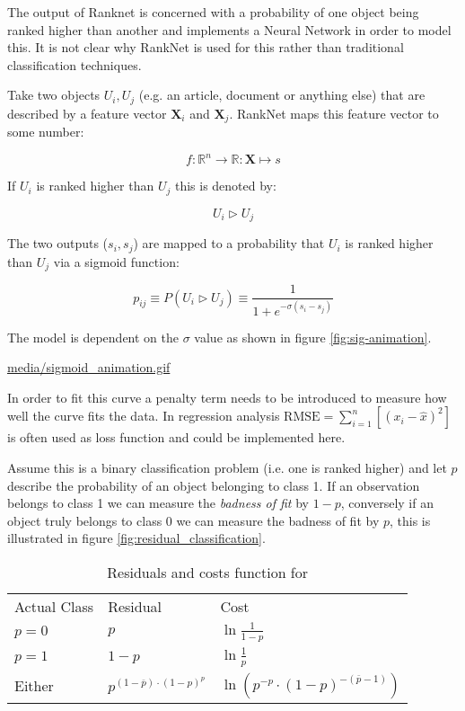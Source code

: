 \documentclass[a4paper,11pt,twoside]{article}
\begin{document}
The output of Ranknet is concerned with a probability of one object being ranked
higher than another and implements a Neural Network in order to model this. It
is not clear why RankNet is used for this rather than traditional classification
techniques.


Take two objects \(U_{i}, U_{j}\) (e.g. an article, document or anything else)
that are described by a feature vector \(\mathbf{X}_{i}\) and
\(\mathbf{X}_{j}\). RankNet maps this feature vector to some number:

\[
f: \mathbb{R}^{n} \rightarrow \mathbb{R}: \mathbf{X} \mapsto s
\]

If \(U_{i}\) is ranked higher than \(U_{j}\) this is denoted by:

\[
U_{i} \triangleright U_{j}
\]

The two outputs (\(s_{i}, s_{j}\)) are mapped to a probability that \(U_{i}\) is
ranked higher than \(U_{j}\) via a sigmoid function:

\[
p_{ij} \equiv P\left(U_{i} \triangleright U_{j} \right) \equiv \frac{1}{1 + e^{-\sigma \left(s_{i}-s_{j}\right)}} \label{eq:sigmoid}
\]

The model is dependent on the \(\sigma\) value as shown in figure \ref{fig:sig-animation}.


\url{media/sigmoid\_animation.gif}

In order to fit this curve a penalty term needs to be introduced to measure how well the curve fits the data. In regression analysis \(\mathrm{RMSE}=\sum_{i=1}^n \left[ \left(x_i - \hat{x}\right)^2 \right]\) is often used as loss function and could be implemented here.

Assume this is a binary classification problem (i.e. one is ranked higher) and
let \(p\) describe the probability of an object belonging to class 1. If an
observation belongs to class 1 we can measure the \emph{badness of fit} by \(1 - p\),
conversely if an object truly belongs to class 0 we can measure the badness of
fit by \(p\), this is illustrated in figure \ref{fig:residual_classification}.

\begin{table}[htbp]
\centering
\begin{tabular}{lll}
Actual Class & Residual & Cost\\
\(p=0\) & \(p\) & \(\ln{\frac{1}{1-p}}\)\\
\(p=1\) & \(1-p\) & \(\ln{\frac{1}{p}}\)\\
Either & \(p^{\left( 1- \overline{p} \right)\cdot  \left( 1- p \right)^{p}}\) & \(\ln{\left( p^{- p}\cdot  \left( 1- p \right)^{- \left( \overline{p} - 1 \right)} \right)}\)\\
\end{tabular}
\caption{\label{table:residuals}Residuals and costs function for}

\end{table}
\end{document}
